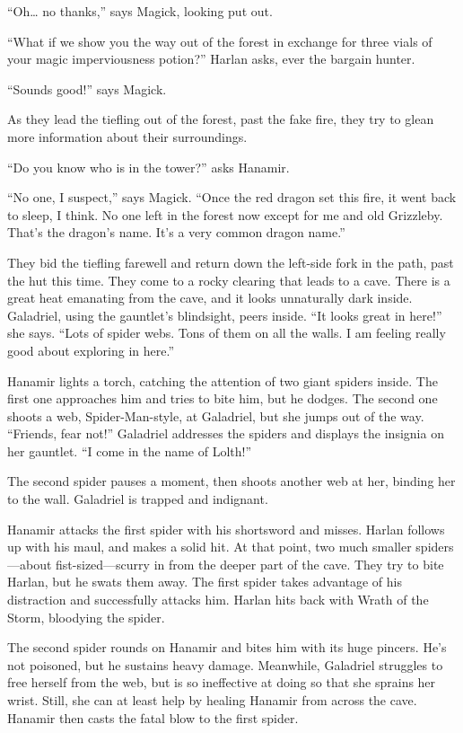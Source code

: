 \documentclass[smalldemyvopaper,11pt,twoside,onecolumn,openright,extrafontsizes]{memoir}
\begin{document}
``Oh\ldots{} no thanks,'' says Magick, looking put out.

``What if we show you the way out of the forest in exchange for three
vials of your magic imperviousness potion?'' Harlan asks, ever the
bargain hunter.

``Sounds good!'' says Magick.

As they lead the tiefling out of the forest, past the fake fire, they
try to glean more information about their surroundings.

``Do you know who is in the tower?'' asks Hanamir.

``No one, I suspect,'' says Magick. ``Once the red dragon set this fire,
it went back to sleep, I think. No one left in the forest now except for
me and old Grizzleby. That's the dragon's name. It's a very common
dragon name.''

They bid the tiefling farewell and return down the left-side fork in the
path, past the hut this time. They come to a rocky clearing that leads
to a cave. There is a great heat emanating from the cave, and it looks
unnaturally dark inside. Galadriel, using the gauntlet's blindsight,
peers inside. ``It looks great in here!'' she says. ``Lots of spider
webs. Tons of them on all the walls. I am feeling really good about
exploring in here.''

Hanamir lights a torch, catching the attention of two giant spiders
inside. The first one approaches him and tries to bite him, but he
dodges. The second one shoots a web, Spider-Man-style, at Galadriel, but
she jumps out of the way. ``Friends, fear not!'' Galadriel addresses the
spiders and displays the insignia on her gauntlet. ``I come in the name
of Lolth!''

The second spider pauses a moment, then shoots another web at her,
binding her to the wall. Galadriel is trapped and indignant.

Hanamir attacks the first spider with his shortsword and misses. Harlan
follows up with his maul, and makes a solid hit. At that point, two much
smaller spiders---about fist-sized---scurry in from the deeper part of
the cave. They try to bite Harlan, but he swats them away. The first
spider takes advantage of his distraction and successfully attacks him.
Harlan hits back with Wrath of the Storm, bloodying the spider.

The second spider rounds on Hanamir and bites him with its huge pincers.
He's not poisoned, but he sustains heavy damage. Meanwhile, Galadriel
struggles to free herself from the web, but is so ineffective at doing
so that she sprains her wrist. Still, she can at least help by healing
Hanamir from across the cave. Hanamir then casts the fatal blow to the
first spider.
\end{document}
